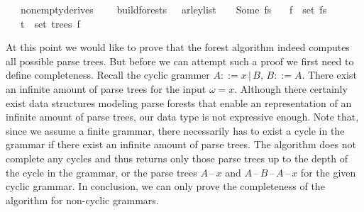 \begin{isabellebody}
\ \ \ {\isachardoublequoteopen}nonempty{\isacharunderscore}{\kern0pt}derives\ {\isasymG}{\isachardoublequoteclose}\isanewline
\ \ \ {\isachardoublequoteopen}build{\isacharunderscore}{\kern0pt}forests\ {\isasymG}\ {\isasymomega}\ {\isacharparenleft}{\kern0pt}{\isasymE}arley{\isacharunderscore}{\kern0pt}list\ {\isasymG}\ {\isasymomega}{\isacharparenright}{\kern0pt}\ {\isacharequal}{\kern0pt}\ Some\ fs{\isachardoublequoteclose}\isanewline
\ \ \ {\isachardoublequoteopen}f\ {\isasymin}\ set\ fs{\isachardoublequoteclose}\isanewline
\ \ \ {\isachardoublequoteopen}t\ {\isasymin}\ set\ {\isacharparenleft}{\kern0pt}trees\ f{\isacharparenright}{\kern0pt}{\isachardoublequoteclose}\isanewline
\ \ \ {\isachardoublequoteopen}{\isasymG}\ {\isasymturnstile}\ {\isacharbrackleft}{\kern0pt}{\isasymSS}\ {\isasymG}{\isacharbrackright}{\kern0pt}\ {\isasymRightarrow}\isactrlsup {\isacharasterisk}{\kern0pt}\ {\isasymomega}{\isachardoublequoteclose}%
\isadelimproof
%
\endisadelimproof
%
\isatagproof
%
\endisatagproof
{\isafoldproof}%
%
\isadelimproof
%
\endisadelimproof
%
\begin{isamarkuptext}%
%
\end{isamarkuptext}\isamarkuptrue%
%
\isadelimdocument
%
\endisadelimdocument
%
\isatagdocument
%
\isamarkuptrue%
%
\endisatagdocument
{\isafolddocument}%
%
\isadelimdocument
%
\endisadelimdocument
%
\begin{isamarkuptext}%
At this point we would like to prove that the forest algorithm indeed computes all possible parse trees.
But before we can attempt such a proof we first need to define completeness. Recall the
cyclic grammer $A ::= x \, | \, B, \, B ::= A$. There exist an infinite amount of parse trees for the
input $\omega = x$. Although there certainly exist data structures modeling parse forests that enable an representation
of an infinite amount of parse trees, our data type  is not expressive enough. Note that,
since we assume a finite grammar, there necessarily has to exist a cycle in the grammar if there exist
an infinite amount of parse trees. The algorithm  does not complete any cycles and
thus returns only those parse trees up to the depth of the cycle in the grammar, or the parse trees
$A \, \text{--} \, x$ and $A \, \text{--} \, B \, \text{--} \, A \, \text{--} \, x$ for the given cyclic grammar. In conclusion,
we can only prove the completeness of the algorithm for non-cyclic grammars.


\end{isamarkuptext}
\end{isabellebody}
